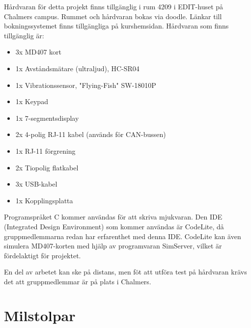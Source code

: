 \documentclass[a4paper]{article}
\begin{document}
Hårdvaran för detta projekt finns tillgänglig i rum 4209 i EDIT-huset på Chalmers campus. Rummet och hårdvaran bokas via doodle. Länkar till bokningssystemet finns tillgängliga på kurshemsidan. Hårdvaran som finns tillgänglig är:

\begin{itemize}
    \item 3x MD407 kort
    \item 1x Avståndsmätare (ultraljud), HC-SR04
    \item 1x Vibrationssensor, "Flying-Fish" SW-18010P
    \item 1x Keypad
    \item 1x 7-segmentsdisplay
    \item 2x 4-polig RJ-11 kabel (används för CAN-bussen)
    \item 1x RJ-11 förgrening
    \item 2x Tiopolig flatkabel
    \item 3x USB-kabel
    \item 1x Kopplingsplatta
\end{itemize}

Programspråket C kommer användas för att skriva mjukvaran. Den IDE (Integrated Design Environment) som kommer användas är CodeLite, då gruppmedlemmarna redan har erfarenthet med denna IDE. CodeLite kan även simulera MD407-korten med hjälp av programvaran SimServer, vilket är fördelaktigt för projektet.


En del av arbetet kan ske på distans, men föt att utföra test på hårdvaran krävs det att gruppmedlemmar är på plats i Chalmers. 


\section{Milstolpar}
\end{document}
